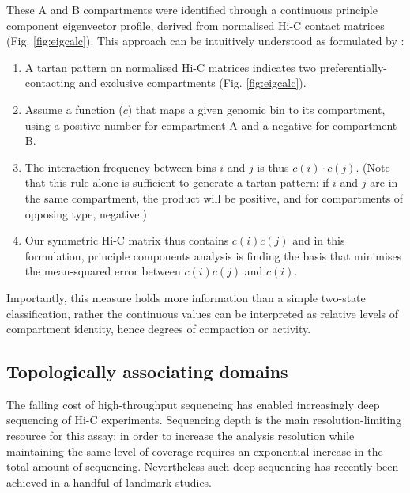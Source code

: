 \documentclass[a4paper,11pt,oneside]{book}
\begin{document}
These A and B  compartments were identified through a continuous principle component eigenvector profile, derived from normalised Hi-C contact matrices\cite{Lieberman2009} (Fig. \ref{fig:eigcalc}). This approach can be intuitively understood as formulated by \citet{Lajoie2014}:
\begin{enumerate}
\item A tartan pattern on normalised Hi-C matrices indicates two preferentially-contacting and exclusive compartments (Fig. \ref{fig:eigcalc}).
\item Assume a function ($c$) that maps a given genomic bin to its compartment, using a positive number for compartment A and a negative for compartment B.
\item The interaction frequency between bins $i$ and $j$ is thus $c(i)\cdot c(j)$. (Note that this rule alone is sufficient to generate a tartan pattern: if $i$ and $j$ are in the same compartment, the product will be positive, and for compartments of opposing type, negative.\cite{Lajoie2014})
\item Our symmetric Hi-C matrix thus contains $c(i)c(j)$ and in this formulation, principle components analysis is finding the basis that minimises the mean-squared error between $c(i)c(j)$ and $c(i)$.
\end{enumerate}
Importantly, this measure holds more information than a simple two-state classification, rather the continuous values can be interpreted as relative levels of compartment identity, hence degrees of compaction or activity.\cite{Dekker2013, Imakaev2012}

\subsection{Topologically associating domains}\label{intro:tads}

The falling cost of high-throughput sequencing has enabled increasingly deep sequencing of Hi-C experiments. Sequencing depth is the main resolution-limiting resource for this assay; in order to increase the analysis resolution while maintaining the same level of coverage requires an exponential increase in the total amount of sequencing.\cite{Lieberman2009, Tanay2013} Nevertheless such deep sequencing has recently been achieved in a handful of landmark studies.
\end{document}
